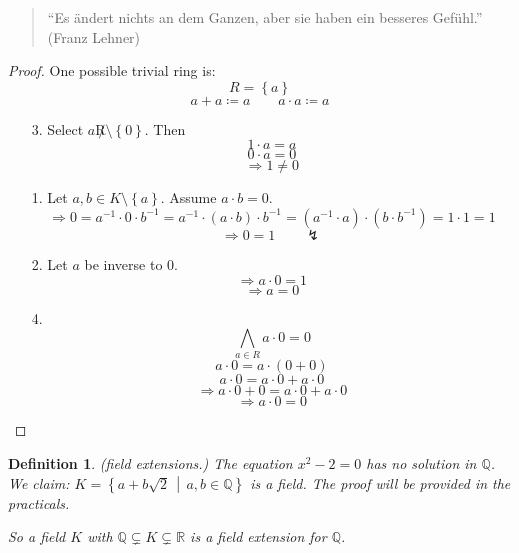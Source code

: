 \documentclass[a4paper,landscape,twocolumn]{article}
\newcommand\set[1]{\left\{#1\right\}}
\newcommand\setdef[2]{\left\{#1\,\middle|\,#2\right\}}
\newtheorem{defi}{Definition}
\begin{document}
\begin{quote}
  \begin{otherlanguage}{ngerman}
    \enquote{Es ändert nichts an dem Ganzen, aber sie haben ein besseres Gefühl.}
    (Franz Lehner)
  \end{otherlanguage}
\end{quote}

\begin{proof}
  One possible trivial ring is:
  \[ R = \set{a} \]
  \[ a + a \coloneqq a \qquad a \cdot a \coloneqq a \]

  \begin{enumerate}
    \item[3.]
      Select $a \not R \setminus \set{0}$. Then
      \[ 1 \cdot a = a \]
      \[ 0 \cdot a = 0 \]
      \[ \Rightarrow 1 \neq 0 \]
    \item[1.]
      Let $a, b \in K \setminus \set{a}$.
      Assume $a \cdot b = 0$.
      \[
        \Rightarrow 0 = a^{-1} \cdot 0 \cdot b^{-1}
        = a^{-1} \cdot (a \cdot b) \cdot b^{-1}
        = (a^{-1} \cdot a) \cdot (b \cdot b^{-1})
        = 1 \cdot 1
        = 1
      \] \[ \Rightarrow 0 = 1 \qquad\lightning \]
    \item[2.]
      Let $a$ be inverse to $0$.
      \[ \Rightarrow a \cdot 0 = 1 \]
      \[ \Rightarrow a = 0 \]
    \item[4.]
      \[ \bigwedge_{a \in R} a \cdot 0 = 0 \]
      \[ a \cdot 0 = a \cdot (0 + 0) \]
      \[ a \cdot 0 = a \cdot 0 + a \cdot 0 \]
      \[ \Rightarrow a \cdot 0 + 0 = a \cdot 0 + a \cdot 0 \]
      \[ \Rightarrow a \cdot 0 = 0 \]
  \end{enumerate}
\end{proof}

\begin{defi}
  \emph{(field extensions.)}
  The equation $x^2 - 2 = 0$ has no solution in $\mathbb Q$.
  We claim:
  $K = \setdef{a + b \sqrt{2}}{a,b \in \mathbb Q}$ is a field.
  The proof will be provided in the practicals.

  So a field $K$ with $\mathbb Q \subsetneq K \subsetneq \mathbb R$
  is a field extension for $\mathbb Q$.
\end{defi}
\end{document}
